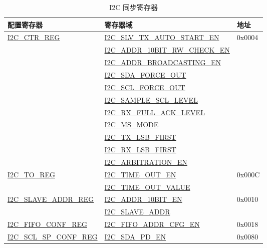 \documentclass[main\_\_CN.tex]{subfiles}
\begin{document}
\begin{longtable}{ | p{6cm} | p{7cm} | p{2cm} | }
\caption{I2C 同步寄存器}
\label{tab:i2c-sync-register}
\\\hline
\rowcolor{lightgray}
配置寄存器& 寄存器域 & 地址  \\ \hline
\hyperref[regdesc:I2CCTRREG]{I2C\_CTR\_REG} & {\hyperref[fielddesc:I2CSLVTXAUTOSTARTEN]{I2C\_SLV\_TX\_AUTO\_START\_EN}} & 0x0004  \\\cline{2-2}
& {\hyperref[fielddesc:I2CADDR10BITRWCHECKEN]{I2C\_ADDR\_10BIT\_RW\_CHECK\_EN}}& \\\cline{2-2}
& {\hyperref[fielddesc:I2CADDRBROADCASTINGEN]{I2C\_ADDR\_BROADCASTING\_EN}}& \\\cline{2-2}
& {\hyperref[fielddesc:I2CSDAFORCEOUT]{I2C\_SDA\_FORCE\_OUT}}& \\\cline{2-2}
& {\hyperref[fielddesc:I2CSCLFORCEOUT]{I2C\_SCL\_FORCE\_OUT}}& \\\cline{2-2}
& {\hyperref[fielddesc:I2CSAMPLESCLLEVEL]{I2C\_SAMPLE\_SCL\_LEVEL}}& \\\cline{2-2}
& {\hyperref[fielddesc:I2CRXFULLACKLEVEL]{I2C\_RX\_FULL\_ACK\_LEVEL}}& \\\cline{2-2}
& {\hyperref[fielddesc:I2CMSMODE]{I2C\_MS\_MODE}}& \\\cline{2-2}
& {\hyperref[fielddesc:I2CTXLSBFIRST]{I2C\_TX\_LSB\_FIRST}}& \\\cline{2-2}
& {\hyperref[fielddesc:I2CRXLSBFIRST]{I2C\_RX\_LSB\_FIRST}}& \\\cline{2-2}
& {\hyperref[fielddesc:I2CARBITRATIONEN]{I2C\_ARBITRATION\_EN}}& \\ \hline
\hyperref[regdesc:I2CTOREG]{I2C\_TO\_REG} & {\hyperref[fielddesc:I2CTIMEOUTEN]{I2C\_TIME\_OUT\_EN}} & 0x000C  \\\cline{2-2}
& {\hyperref[fielddesc:I2CTIMEOUTVALUE]{I2C\_TIME\_OUT\_VALUE}}& \\ \hline
\hyperref[regdesc:I2CSLAVEADDRREG]{I2C\_SLAVE\_ADDR\_REG} & {\hyperref[fielddesc:I2CADDR10BITEN]{I2C\_ADDR\_10BIT\_EN}} & 0x0010 \\\cline{2-2}
& {\hyperref[fielddesc:I2CSLAVEADDR]{I2C\_SLAVE\_ADDR}}& \\ \hline
\hyperref[regdesc:I2CFIFOCONFREG]{I2C\_FIFO\_CONF\_REG} & {\hyperref[fielddesc:I2CFIFOADDRCFGEN]{I2C\_FIFO\_ADDR\_CFG\_EN}} & 0x0018 \\ \hline
\hyperref[regdesc:I2CSCLSPCONFREG]{I2C\_SCL\_SP\_CONF\_REG} & {\hyperref[fielddesc:I2CSDAPDEN]{I2C\_SDA\_PD\_EN}} & 0x0080  \\\cline{2-2}

\end{longtable}
\end{document}
